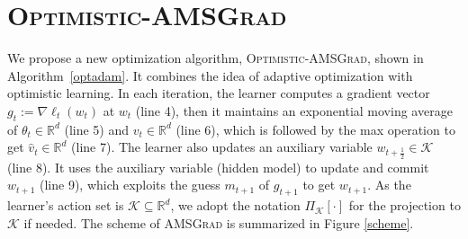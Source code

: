 \documentclass[11pt]{article}
\def\K{\mathcal{K}}
\theoremstyle{k}
\begin{document}
\section{\textsc{Optimistic-AMSGrad}}
We propose a new optimization algorithm,
\textsc{Optimistic-AMSGrad}, shown in Algorithm~\ref{optadam}. It combines the idea of adaptive optimization with optimistic learning. In each iteration, the learner computes a gradient vector $g_{t}:= \nabla \ell_t( w_t)$ at $w_{t}$ (line 4), then it maintains an exponential moving average of $\theta_{t} \in \mathbb R^{d}$ (line 5) and $v_{t} \in \mathbb R^{d}$ (line 6), which is followed by
the max operation to get $\hat{v}_{t} \in \mathbb R^{d}$ (line 7).
The learner also updates an auxiliary variable $w_{t+\frac{1}{2}} \in \K$ (line 8). It uses the auxiliary variable (hidden model) to update and commit $w_{t+1}$ (line 9), which exploits the guess $m_{t+1}$ of $g_{t+1}$ to get $w_{t+1}$.
As the learner's action set is $\K \subseteq \mathbb R^{d}$, we adopt the notation $\Pi_{\K}[\cdot]$ for the projection to $\K$ if needed. The scheme of \textsc{AMSGrad} is summarized in Figure \ref{scheme}.
\end{document}
